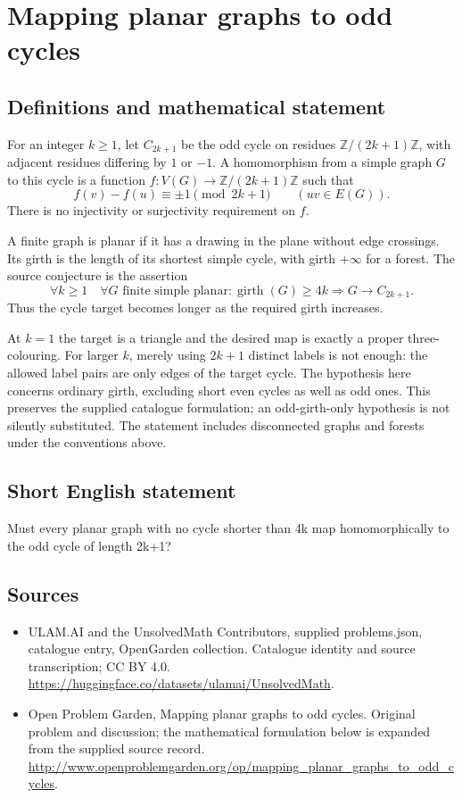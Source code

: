 \documentclass[11pt,a4paper]{article}
\begin{document}
\section*{Mapping planar graphs to odd cycles}\label{statement}

\subsection{Definitions and mathematical statement}
For an integer $k\geq1$, let $C_{2k+1}$
be the odd cycle on residues
$\mathbb Z/(2k+1)\mathbb Z$, with adjacent
residues differing by $1$ or $-1$.
A homomorphism from a simple graph $G$
to this cycle is a function
$f:V(G)\to\mathbb Z/(2k+1)\mathbb Z$
such that
\[
 f(v)-f(u)\equiv\pm1\pmod{2k+1}
 \qquad(uv\in E(G)).
\]
There is no injectivity or surjectivity
requirement on $f$.

A finite graph is planar if it has a
drawing in the plane without edge
crossings. Its girth is the length of
its shortest simple cycle, with girth
$+\infty$ for a forest. The source
conjecture is the assertion
\[
 \forall k\geq1\quad\forall G\text{ finite simple planar}:
 \operatorname{girth}(G)\geq4k
 \Longrightarrow G\to C_{2k+1}.
\]
Thus the cycle target becomes longer
as the required girth increases.

At $k=1$ the target is a triangle and
the desired map is exactly a proper
three-colouring. For larger $k$, merely
using $2k+1$ distinct labels is not
enough: the allowed label pairs are
only edges of the target cycle.
The hypothesis here concerns ordinary
girth, excluding short even cycles
as well as odd ones. This preserves
the supplied catalogue formulation;
an odd-girth-only hypothesis is not
silently substituted. The statement
includes disconnected graphs and
forests under the conventions above.
\subsection{Short English statement}
Must every planar graph with no cycle shorter than 4k map homomorphically to the odd cycle of length 2k+1?
\subsection{Sources}
\begin{itemize}
\item[S1] ULAM.AI and the UnsolvedMath Contributors, supplied problems.json, catalogue entry, OpenGarden collection. Catalogue identity and source transcription; CC BY 4.0.
\url{https://huggingface.co/datasets/ulamai/UnsolvedMath}.
\item[S2] Open Problem Garden, Mapping planar graphs to odd cycles. Original problem and discussion; the mathematical formulation below is expanded from the supplied source record.
\url{http://www.openproblemgarden.org/op/mapping_planar_graphs_to_odd_cycles}.
\end{itemize}
\end{document}
